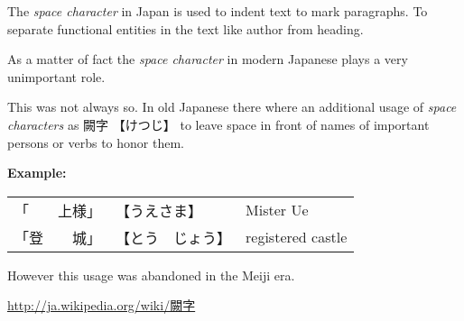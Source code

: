 The \textit{space character} in Japan is used to indent text to mark
paragraphs. To separate functional entities in the text like author from
heading. 

As a matter of fact the \textit{space character} in modern Japanese plays a
very unimportant role. 

This was not always so. In old Japanese there where an additional usage of
\textit{space characters} as {闕字} {【けつじ】} to leave space in front of
names of important persons or verbs to honor them.

\smallskip
\textbf{Example:}

\begin{center}\Padding\begin{tabular}{p{4cm}p{3cm}p{4cm}}
 {「　　上様」} & {【うえさま】}      & Mister Ue \\
 {「登　　城」} &  {【とう　じょう】} & registered castle\\
\end{tabular}\end{center}
\smallskip

However this usage was abandoned in the Meiji era. 

\Link \href{http://ja.wikipedia.org/wiki/%E9%97%95%E5%AD%97}{http://ja.wikipedia.org/wiki/闕字}

